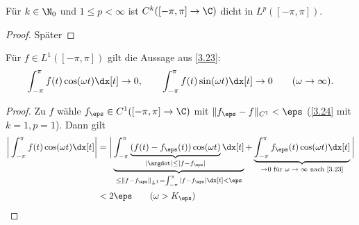 \begin{lem} \label{3.24}
	Für $k \in \N_0$ und $1 \le p < \infty$ ist $C^k([-\pi, \pi] \to \C)$ dicht in $L^p([-\pi, \pi])$.
	\begin{proof}
		Später
	\end{proof}
\end{lem}

\begin{st} \label{3.25}
	Für $f \in L^1([-\pi, \pi])$ gilt die Aussage aus \ref{3.23}:
	\[
		\int_{-\pi}^{\pi} f(t) \cos(\omega t) \dx[t] \to 0, \qquad
		\int_{-\pi}^{\pi} f(t) \sin(\omega t) \dx[t] \to 0 \qquad (\omega \to \infty).
	\]
	\begin{proof}
		Zu $f$ wähle $f_\eps \in C^1 ([-\pi,\pi] \to \C)$ mit $\|f_\eps - f\|_{C^1} < \eps$ (\ref{3.24} mit $k=1, p=1$).
		Dann gilt
		\begin{align*}
			\bigg|\int_{-\pi}^{\pi} f(t) \cos(\omega t) \dx[t] \bigg|
			&= \bigg| \underbrace{\int_{-\pi}^{\pi} \underbrace{(f(t) - f_\eps(t)) \cos(\omega t)}_{|\argdot| \le |f-f_\eps|} \dx[t]}_{\le \|f - f_\eps\|_{L^1} = \int_{-\pi}^\pi |f-f_\eps| \dx[t] < \eps} + \underbrace{\int_{-\pi}^{\pi} f_\eps (t) \cos(\omega t) \dx[t]}_{\to 0 \text{ für $\omega \to \infty$ nach \ref{3.23}}} \bigg| \\
			&< 2\eps \qquad (\omega > K_\eps)
		\end{align*}
	\end{proof}
\end{st}

